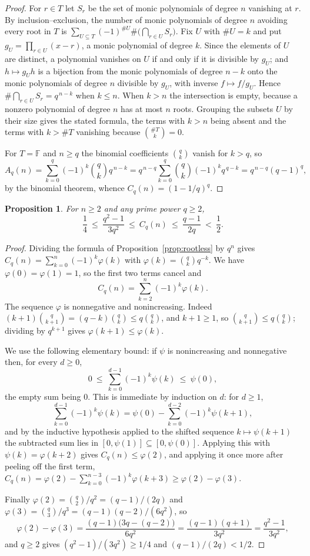 \documentclass[11pt,reqno]{amsart}
\theoremstyle{plain}
\newtheorem{proposition}[theorem]{Proposition}
\theoremstyle{definition}
\theoremstyle{remark}
\newcommand{\F}{\mathbb{F}}
\begin{document}
\begin{proof}
For $r\in T$ let $S_r$ be the set of monic polynomials of degree $n$ vanishing at $r$. By
inclusion--exclusion, the number of monic polynomials of degree $n$ avoiding every root in $T$ is
$\sum_{U\subseteq T}(-1)^{\#U}\#\bigl(\bigcap_{r\in U}S_r\bigr)$. Fix $U$ with $\#U=k$ and put
$g_U=\prod_{r\in U}(x-r)$, a monic polynomial of degree $k$. Since the elements of $U$ are
distinct, a polynomial vanishes on $U$ if and only if it is divisible by $g_U$; and
$h\mapsto g_Uh$ is a bijection from the monic polynomials of degree $n-k$ onto the monic
polynomials of degree $n$ divisible by $g_U$, with inverse $f\mapsto f/g_U$. Hence
$\#\bigcap_{r\in U}S_r=q^{\,n-k}$ when $k\le n$. When $k>n$ the intersection is empty, because a
nonzero polynomial of degree $n$ has at most $n$ roots. Grouping the subsets $U$ by their size
gives the stated formula, the terms with $k>n$ being absent and the terms with $k>\#T$ vanishing
because $\binom{\#T}{k}=0$.

For $T=\F$ and $n\ge q$ the binomial coefficients $\binom qk$ vanish for $k>q$, so
\[
  A_q(n)=\sum_{k=0}^{q}(-1)^k\binom qk q^{\,n-k}
  =q^{\,n-q}\sum_{k=0}^{q}\binom qk(-1)^kq^{\,q-k}
  =q^{\,n-q}(q-1)^q,
\]
by the binomial theorem, whence $C_q(n)=(1-1/q)^q$.
\end{proof}

\begin{proposition}\label{prop:bounds}
For $n\ge2$ and any prime power $q\ge2$,
\[
  \frac14\ \le\ \frac{q^2-1}{3q^2}\ \le\ C_q(n)\ \le\ \frac{q-1}{2q}\ <\ \frac12 .
\]
\end{proposition}

\begin{proof}
Dividing the formula of Proposition~\ref{prop:rootless} by $q^n$ gives
$C_q(n)=\sum_{k=0}^{n}(-1)^k\varphi(k)$ with $\varphi(k)=\binom qk q^{-k}$. We have
$\varphi(0)=\varphi(1)=1$, so the first two terms cancel and
\[
  C_q(n)=\sum_{k=2}^{n}(-1)^k\varphi(k).
\]
The sequence $\varphi$ is nonnegative and nonincreasing. Indeed
$(k+1)\binom{q}{k+1}=(q-k)\binom qk\le q\binom qk$, and $k+1\ge1$, so
$\binom{q}{k+1}\le q\binom qk$; dividing by $q^{k+1}$ gives
$\varphi(k+1)\le\varphi(k)$.

We use the following elementary bound: if $\psi$ is nonincreasing and nonnegative then, for
every $d\ge0$,
\[
  0\ \le\ \sum_{k=0}^{d-1}(-1)^k\psi(k)\ \le\ \psi(0),
\]
the empty sum being $0$. This is immediate by induction on $d$: for $d\ge1$,
\[
  \sum_{k=0}^{d-1}(-1)^k\psi(k)=\psi(0)-\sum_{k=0}^{d-2}(-1)^k\psi(k+1),
\]
and by the inductive hypothesis applied to the shifted sequence $k\mapsto\psi(k+1)$ the
subtracted sum lies in $[0,\psi(1)]\subseteq[0,\psi(0)]$. Applying this with $\psi(k)=\varphi(k+2)$ gives $C_q(n)\le\varphi(2)$, and applying
it once more after peeling off the first term,
$C_q(n)=\varphi(2)-\sum_{k=0}^{n-3}(-1)^k\varphi(k+3)\ge\varphi(2)-\varphi(3)$.

Finally $\varphi(2)=\binom q2/q^2=(q-1)/(2q)$ and $\varphi(3)=\binom q3/q^3=(q-1)(q-2)/(6q^2)$, so
\[
  \varphi(2)-\varphi(3)=\frac{(q-1)\bigl(3q-(q-2)\bigr)}{6q^2}=\frac{(q-1)(q+1)}{3q^2}=\frac{q^2-1}{3q^2},
\]
and $q\ge 2$ gives $(q^2-1)/(3q^2)\ge 1/4$ and $(q-1)/(2q)<1/2$.
\end{proof}
\end{document}
